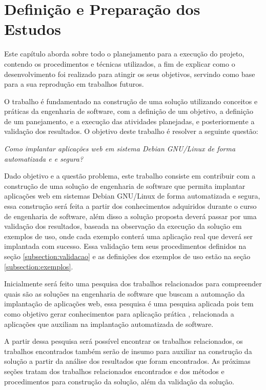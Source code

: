 \chapter{Definição e Preparação dos Estudos}

\label{cap-metodologia}
Este capítulo aborda sobre todo o planejamento para a execução do projeto,
contendo os procedimentos e técnicas utilizados, a fim de
explicar como o desenvolvimento foi realizado para atingir os seus objetivos,
servindo como base para a sua reprodução em trabalhos futuros.

O trabalho é fundamentado na construção de uma solução utilizando conceitos e práticas
da engenharia de software, com a definição de um objetivo, a definição de um panejamento,
e a execução das atividades planejadas, e posteriormente a validação dos resultados.
O objetivo deste trabalho é resolver a seguinte questão:

\begin{center}
  \textit{
  Como implantar aplicações web em sistema Debian GNU/Linux de forma automatizada e
  e segura?
}
\end{center}

Dado objetivo e a questão problema, este trabalho consiste em contribuir
com a construção de uma solução de engenharia de software que permita implantar
aplicações web em sistemas Debian GNU/Linux de forma automatizada e segura, essa
construção será feita a partir dos conhecimentos adquiridos durante
o curso de engenharia de software, além disso a solução proposta deverá passar
por uma validação dos resultados, baseada na observação
da execução da solução em exemplos de uso, onde cada exemplo conterá uma aplicação
real que deverá ser implantada com sucesso. Essa validação tem seus procedimentos
definidos na seção \ref{subsection:validacao} e as definições dos exemplos de uso
estão na seção \ref{subsection:exemplos}.

Inicialmente será feito uma pesquisa dos trabalhos relacionados para compreender
quais são as soluções na engenharia de software que buscam a automação da implantação
de aplicações web, essa pesquisa é uma pesquisa aplicada pois tem como objetivo
gerar conhecimentos para aplicação prática \cite{gerhardt2009metodos},
relacionada a aplicações que auxiliam na implantação automatizada de software.

A partir dessa pesquisa será possível encontrar os trabalhos relacionados, os
trabalhos encontrados também serão de insumo para auxiliar na construção da
solução a partir da análise dos resultados que foram encontrados. As próximas
seções tratam dos trabalhos relacionados encontrados e dos métodos e
procedimentos para construção da solução, além da validação da solução.

